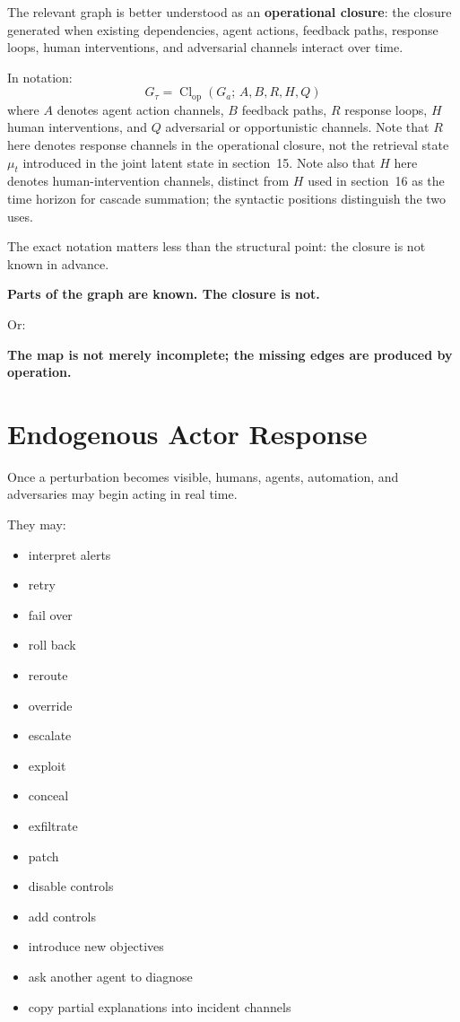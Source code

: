 \documentclass[11pt]{article}
\DeclareMathOperator{\Cl}{Cl}
\begin{document}
The relevant graph is better understood as an \textbf{operational closure}: the closure generated when existing dependencies, agent actions, feedback paths, response loops, human interventions, and adversarial channels interact over time.

In notation:
\[
G_\tau = \Cl_{\text{op}}(G_a;\, A, B, R, H, Q)
\]
where $A$ denotes agent action channels, $B$ feedback paths, $R$ response loops, $H$ human interventions, and $Q$ adversarial or opportunistic channels. Note that $R$ here denotes response channels in the operational closure, not the retrieval state $\mu_t$ introduced in the joint latent state in section~15. Note also that $H$ here denotes human-intervention channels, distinct from $H$ used in section~16 as the time horizon for cascade summation; the syntactic positions distinguish the two uses.

The exact notation matters less than the structural point: the closure is not known in advance.

\begin{pullquote}
\textbf{Parts of the graph are known. The closure is not.}
\end{pullquote}

Or:

\begin{pullquote}
\textbf{The map is not merely incomplete; the missing edges are produced by operation.}
\end{pullquote}

\section{Endogenous Actor Response}

Once a perturbation becomes visible, humans, agents, automation, and adversaries may begin acting in real time.

They may:
\begin{itemize}
\item interpret alerts
\item retry
\item fail over
\item roll back
\item reroute
\item override
\item escalate
\item exploit
\item conceal
\item exfiltrate
\item patch
\item disable controls
\item add controls
\item introduce new objectives
\item ask another agent to diagnose
\item copy partial explanations into incident channels
\end{itemize}
\end{document}
